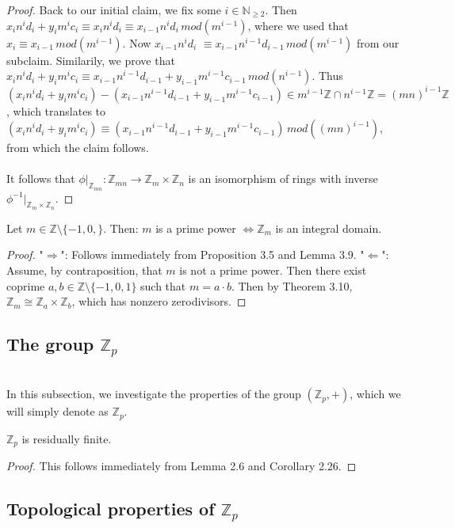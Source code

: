 \begin{proof}
Back to our initial claim, we fix some $i \in \mathbb{N}_{\geq 2}$. Then $x_i n^i d_i +  y_i m^i c_i  \equiv x_i n^i d_i \equiv x_{i-1} n^i d_i \, mod(m ^{i-1} )$, where we used that $x_i \equiv x_{i-1} \, mod (m ^{i-1})$. Now $x_{i-1} n^i d_i$ \newline $\equiv x_{i-1} n^{i-1} d_{i-1} \, mod( m^{i-1} )$ from our subclaim. Similarily, we prove that $x_i n^i d_i +  y_i m^i c_i  \equiv x_{i-1} n^{i-1} d_{i-1} + y_{i-1} m^{i-1} c_{i-1} \, mod(n^{i-1})$. \newline Thus $(x_i n^i d_i +  y_i m^i c_i)  - (x_{i-1} n^{i-1} d_{i-1} + y_{i-1} m^{i-1} c_{i-1}) \in m^{i-1} \mathbb{Z} \cap n^{i-1} \mathbb{Z} = (mn)^{i-1} \mathbb{Z}$, which translates to $(x_i n^i d_i +  y_i m^i c_i)  \equiv (x_{i-1} n^{i-1} d_{i-1} + y_{i-1} m^{i-1} c_{i-1}) \, mod( (mn)^{i-1} )$, from which the claim follows.
\\~\\
It follows that $ \phi |_{ \mathbb{Z}_{mn} } : \mathbb{Z}_{mn} \rightarrow \mathbb{Z}_m \times \mathbb{Z}_n$ is an isomorphism of rings with inverse $\phi^{-1} |_{ \mathbb{Z}_m \times \mathbb{Z}_n }$.

\end{proof}

\begin{corollary}
Let $m \in \mathbb{Z} \setminus \{ -1,0, \}$. Then: $m$ is a prime power  $\Leftrightarrow \mathbb{Z}_m$ is an integral domain.
\end{corollary}

\begin{proof}
"$\Rightarrow$": Follows immediately from Proposition 3.5 and Lemma 3.9. \newline
"$\Leftarrow$": Assume, by contraposition, that $m$ is not a prime power. Then there exist coprime $a,b \in \mathbb{Z} \setminus \{-1, 0,1 \}$ such that  $m = a \cdot b$. Then by Theorem 3.10, $\mathbb{Z}_m \cong \mathbb{Z}_a \times \mathbb{Z}_b$, which has nonzero zerodivisors.
\end{proof}

\subsection{The group $\mathbb{Z}_p$} \hfill\\

In this subsection, we investigate the properties of the group $(\mathbb{Z}_p, +)$, which we will simply denote as $\mathbb{Z}_p$.

\begin{corollary}
$\mathbb{Z}_p$ is residually finite.
\end{corollary}

\begin{proof}
This follows immediately from Lemma 2.6 and Corollary 2.26.
\end{proof}

\subsection{ Topological properties of $\mathbb{Z}_p$}


\printbibliography



